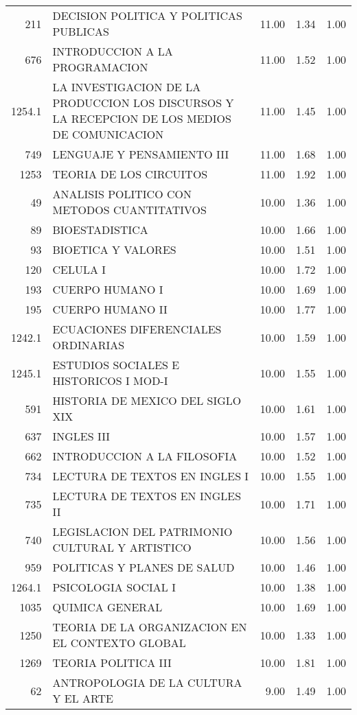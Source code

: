 \begin{table}[ht]
\begin{tabular}{rlrrr}
  211 & DECISION POLITICA Y POLITICAS PUBLICAS & 11.00 & 1.34 & 1.00 \\ 
  676 & INTRODUCCION A LA PROGRAMACION & 11.00 & 1.52 & 1.00 \\ 
  1254.1 & LA INVESTIGACION DE LA PRODUCCION LOS DISCURSOS Y LA RECEPCION DE LOS MEDIOS DE COMUNICACION & 11.00 & 1.45 & 1.00 \\ 
  749 & LENGUAJE Y PENSAMIENTO III & 11.00 & 1.68 & 1.00 \\ 
  1253 & TEORIA DE LOS CIRCUITOS & 11.00 & 1.92 & 1.00 \\ 
  49 & ANALISIS POLITICO CON METODOS CUANTITATIVOS & 10.00 & 1.36 & 1.00 \\ 
  89 & BIOESTADISTICA & 10.00 & 1.66 & 1.00 \\ 
  93 & BIOETICA Y VALORES & 10.00 & 1.51 & 1.00 \\ 
  120 & CELULA I & 10.00 & 1.72 & 1.00 \\ 
  193 & CUERPO HUMANO I & 10.00 & 1.69 & 1.00 \\ 
  195 & CUERPO HUMANO II & 10.00 & 1.77 & 1.00 \\ 
  1242.1 & ECUACIONES DIFERENCIALES ORDINARIAS & 10.00 & 1.59 & 1.00 \\ 
  1245.1 & ESTUDIOS SOCIALES E HISTORICOS I MOD-I & 10.00 & 1.55 & 1.00 \\ 
  591 & HISTORIA DE MEXICO DEL SIGLO XIX & 10.00 & 1.61 & 1.00 \\ 
  637 & INGLES III & 10.00 & 1.57 & 1.00 \\ 
  662 & INTRODUCCION A LA FILOSOFIA & 10.00 & 1.52 & 1.00 \\ 
  734 & LECTURA DE TEXTOS EN INGLES I & 10.00 & 1.55 & 1.00 \\ 
  735 & LECTURA DE TEXTOS EN INGLES II & 10.00 & 1.71 & 1.00 \\ 
  740 & LEGISLACION DEL PATRIMONIO CULTURAL Y ARTISTICO & 10.00 & 1.56 & 1.00 \\ 
  959 & POLITICAS Y PLANES DE SALUD & 10.00 & 1.46 & 1.00 \\ 
  1264.1 & PSICOLOGIA SOCIAL I & 10.00 & 1.38 & 1.00 \\ 
  1035 & QUIMICA GENERAL & 10.00 & 1.69 & 1.00 \\ 
  1250 & TEORIA DE LA ORGANIZACION EN EL CONTEXTO GLOBAL & 10.00 & 1.33 & 1.00 \\ 
  1269 & TEORIA POLITICA III & 10.00 & 1.81 & 1.00 \\ 
  62 & ANTROPOLOGIA DE LA CULTURA Y EL ARTE & 9.00 & 1.49 & 1.00 \\ 

\end{tabular}
\end{table}
